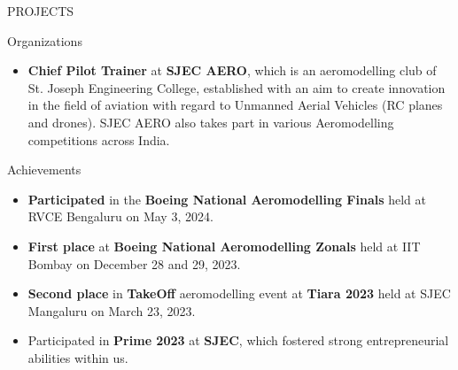 \documentclass{resume} %
\begin{document}
\begin{rSection}{PROJECTS}
\end{rSection}


\begin{rSection}{Organizations}
    \begin{itemize}


        \item 	\textbf{Chief Pilot Trainer} at \textbf{SJEC AERO}, which is an aeromodelling club of St. Joseph Engineering College, established with an aim to
              create innovation in the field of aviation with regard to Unmanned Aerial Vehicles (RC planes and
              drones). SJEC AERO also takes part in various Aeromodelling competitions across India.



    \end{itemize}


\end{rSection}


\begin{rSection}{Achievements}
    \begin{itemize}
        \item 	\textbf{Participated} in the \textbf{Boeing National Aeromodelling Finals} held at RVCE Bengaluru on May 3, 2024.

        \item 	\textbf{First place} at \textbf{Boeing National Aeromodelling Zonals} held at IIT Bombay on December 28 and 29, 2023.
              \item 	\textbf{Second place} in \textbf{TakeOff} aeromodelling event at \textbf{Tiara 2023} held at SJEC Mangaluru on March 23, 2023.

              \item Participated in \textbf{Prime 2023} at \textbf{SJEC}, which fostered strong entrepreneurial abilities within us.


    \end{itemize}


\end{rSection}
\end{document}

